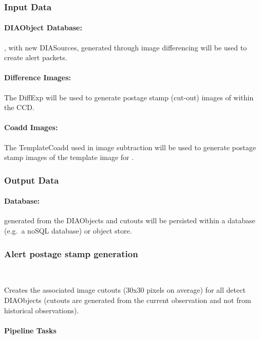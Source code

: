 \subsubsection{Input Data}
\label{sec:apADInput}

\paragraph*{DIAObject Database:} \DIAObjects, with new DIASources, generated through image differencing will be used to create alert packets.

\paragraph*{Difference Images:} The DiffExp will be used to  generate postage stamp (cut-out) images of \DIASources within the CCD. 

\paragraph*{Coadd Images:} The TemplateCoadd used in image subtraction will be used to  generate postage stamp images of the template image for \DIAObjects.


\subsubsection{Output Data}

\paragraph*{\VOEvent Database:} \VOEvents generated from the DIAObjects and cutouts will be persisted within a database (e.g.\ a noSQL database) or object store. 




\subsubsection{Alert postage stamp generation}~

Creates the associated image cutouts (30x30 pixels on average) for all detect DIAObjects (cutouts are generated from the current observation and not from historical observations).

\paragraph{Pipeline Tasks}

